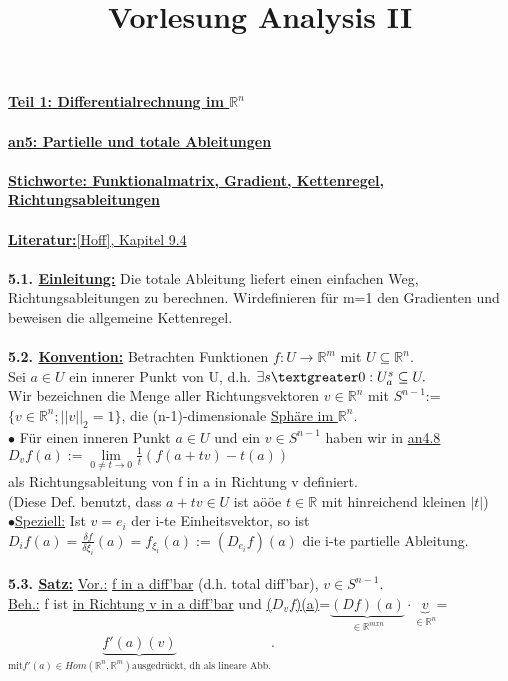 \documentclass[]{scrartcl}
\title{Vorlesung Analysis II}
\begin{document}
	\textbf{\underline{Teil 1: Differentialrechnung im $\mathbb{R}^n$}}\\
	\\
	\textbf{\underline{an5: Partielle und totale Ableitungen}}\\
	\\
	\textbf{\underline{\underline{Stichworte:} Funktionalmatrix, Gradient, 
	Kettenregel, Richtungsableitungen}}\\
	\\
	\textbf{\underline{Literatur:}}\ul{[Hoff], Kapitel 9.4}\\
	\\
	\textbf{5.1. \underline{Einleitung:}} Die totale Ableitung liefert einen 
	einfachen Weg, Richtungsableitungen zu berechnen. Wirdefinieren für m=1 den 
	Gradienten und beweisen die allgemeine Kettenregel.\\
	\\
	\textbf{5.2. \underline{Konvention:}} Betrachten Funktionen 
	$f:U\rightarrow\mathbb{R}^m$ mit $U\subseteq \mathbb{R}^n$.\\
	Sei $a\in U$ ein innerer Punkt von U, d.h. $\exists s\textgreater0: 
	U_a^s\subseteq U.$\\
	Wir bezeichnen die Menge aller Richtungsvektoren $v\in \mathbb{R}^n$ mit 
	\ul{$S^{n-1}$}:=$\{v\in \mathbb{R}^n; ||v||_2=1\}$, die 
	(n-1)-dimensionale \ul{Sphäre im $\mathbb{R}^n$}.\\
	$\bullet$ Für einen inneren Punkt $a\in U$ und ein $v\in S^{n-1}$ haben wir 
	in \ul{an4.8}\\
	$D_vf(a):=\lim\limits_{0\neq t\rightarrow0}\frac{1}{t}(f(a+tv)-t(a))$\\
	als Richtungsableitung von f in a in Richtung v definiert.\\
	(Diese Def. benutzt, dass $a+t v\in U$ ist aööe $t\in\mathbb{R}$ mit 
	hinreichend kleinen $|t|$)\\
	$\bullet$\underline{Speziell:} Ist $v=e_i$ der i-te Einheitsvektor, so ist\\
	$D_if(a)=\frac{\delta f}{\delta \xi_i}(a)=f_{\xi_i}(a):=(D_{e_i}f)(a)$ die 
	i-te partielle Ableitung.\\
	\\
	\textbf{5.3. \underline{Satz:}} \underline{Vor.:} \ul{f 
	in a diff'bar} (d.h. total diff'bar), \ul{$v\in S^{n-1}$}.\\
	\underline{Beh.:} f ist \ul{in Richtung v in a diff'bar} und 
	\ul{($D_vf$)(a)}=\ul{$\underbrace{(Df)(a)}_{\in\mathbb{R}^{m x n}}\cdot 
	\underbrace{v}_{\in\mathbb{R}^n}$}=$\underbrace{f'(a)(v)}_{\text{mit} 
	f'(a)\in Hom(\mathbb{R}^n,\mathbb{R}^m)\text{ausgedrückt, dh als lineare 
	Abb.}}$.\\
\end{document}
